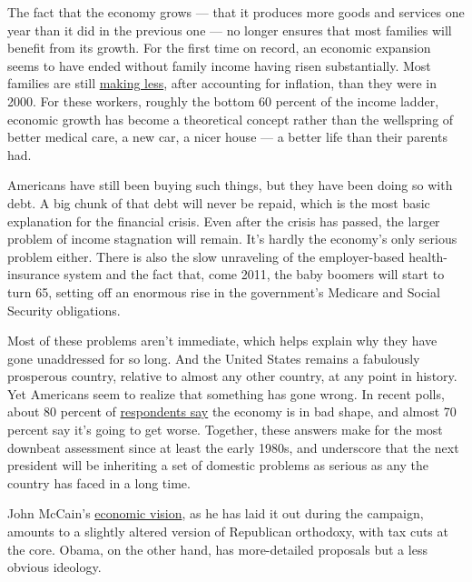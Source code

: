 The fact that the economy grows --- that it produces more goods and
services one year than it did in the previous one --- no longer ensures
that most families will benefit from its growth. For the first time on
record, an economic expansion seems to have ended without family income
having risen substantially. Most families are still
\href{http://www.census.gov/hhes/www/income/histinc/f07ar.html}{making
less}, after accounting for inflation, than they were in 2000. For these
workers, roughly the bottom 60 percent of the income ladder, economic
growth has become a theoretical concept rather than the wellspring of
better medical care, a new car, a nicer house --- a better life than
their parents had.

Americans have still been buying such things, but they have been doing
so with debt. A big chunk of that debt will never be repaid, which is
the most basic explanation for the financial crisis. Even after the
crisis has passed, the larger problem of income stagnation will remain.
It's hardly the economy's only serious problem either. There is also the
slow unraveling of the employer-based health-insurance system and the
fact that, come 2011, the baby boomers will start to turn 65, setting
off an enormous rise in the government's Medicare and Social Security
obligations.

Most of these problems aren't immediate, which helps explain why they
have gone unaddressed for so long. And the United States remains a
fabulously prosperous country, relative to almost any other country, at
any point in history. Yet Americans seem to realize that something has
gone wrong. In recent polls, about 80 percent of
\href{http://nytimes.com/polls}{respondents say} the economy is in bad
shape, and almost 70 percent say it's going to get worse. Together,
these answers make for the most downbeat assessment since at least the
early 1980s, and underscore that the next president will be inheriting a
set of domestic problems as serious as any the country has faced in a
long time.

John McCain's
\href{http://www.johnmccain.com/Informing/News/Speeches/4c980d5b-dfd3-40a3-9663-7d14df1f1468.htm}{economic
vision}, as he has laid it out during the campaign, amounts to a
slightly altered version of Republican orthodoxy, with tax cuts at the
core. Obama, on the other hand, has more-detailed proposals but a less
obvious ideology.

